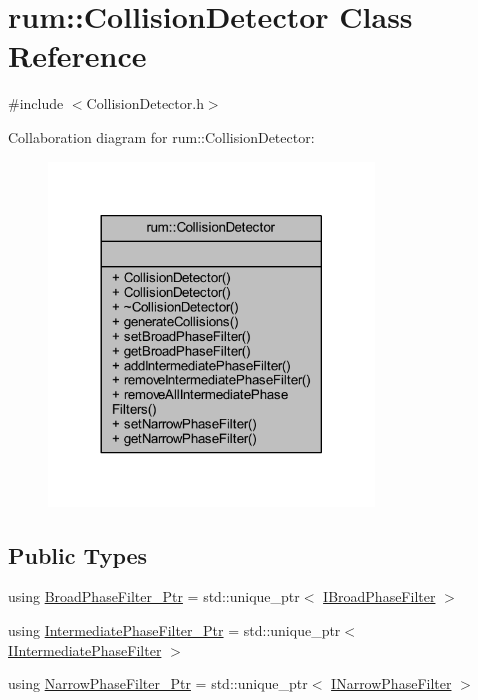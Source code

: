 \hypertarget{classrum_1_1_collision_detector}{}\section{rum\+:\+:Collision\+Detector Class Reference}
\label{classrum_1_1_collision_detector}


{\ttfamily \#include $<$Collision\+Detector.\+h$>$}



Collaboration diagram for rum\+:\+:Collision\+Detector\+:\nopagebreak
\begin{figure}[H]
\begin{center}
\leavevmode
\includegraphics[width=245pt]{classrum_1_1_collision_detector__coll__graph}
\end{center}
\end{figure}
\subsection*{Public Types}
\begin{DoxyCompactItemize}
\item 
using \mbox{\hyperlink{classrum_1_1_collision_detector_a76f794d3db7491b5b21137c6332eccb3}{Broad\+Phase\+Filter\+\_\+\+Ptr}} = std\+::unique\+\_\+ptr$<$ \mbox{\hyperlink{classrum_1_1_i_broad_phase_filter}{I\+Broad\+Phase\+Filter}} $>$
\item 
using \mbox{\hyperlink{classrum_1_1_collision_detector_aa1a7155543cdbe0265865b3e6f14b260}{Intermediate\+Phase\+Filter\+\_\+\+Ptr}} = std\+::unique\+\_\+ptr$<$ \mbox{\hyperlink{classrum_1_1_i_intermediate_phase_filter}{I\+Intermediate\+Phase\+Filter}} $>$
\item 
using \mbox{\hyperlink{classrum_1_1_collision_detector_a8a6d24fed38f8be11b25e43eaabc9638}{Narrow\+Phase\+Filter\+\_\+\+Ptr}} = std\+::unique\+\_\+ptr$<$ \mbox{\hyperlink{classrum_1_1_i_narrow_phase_filter}{I\+Narrow\+Phase\+Filter}} $>$
\end{DoxyCompactItemize}
